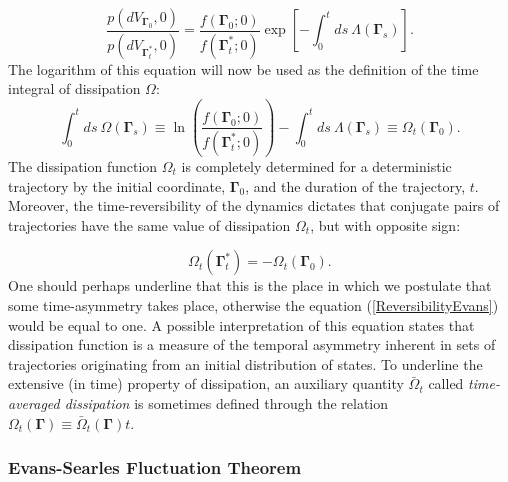 \documentclass[a4paper,12pt]{article}
\begin{document}
\begin{equation}
  \frac{p(d V_{\bm{\Gamma}_0}, 0)}{p(d V_{\bm{\Gamma}_t^*},0)}=
  \frac{f(\bm{\Gamma}_0;0)}{f(\bm{\Gamma}_t^*;0)} 
  \exp[-\int_0^t ds \ \Lambda(\bm{\Gamma}_s)].
\end{equation}
The logarithm of this equation will now be used as the definition of the time integral of dissipation $\Omega$:
\begin{equation}
  \label{Dissipation}
  \int_0^t ds\ \Omega(\bm{\Gamma}_s)\equiv \ln(\frac{f(\bm{\Gamma}_0;0)}{f(\bm{\Gamma}_t^*;0)}) -\int_0^t ds \ \Lambda(\bm{\Gamma}_s) \equiv \Omega_t(\bm{\Gamma}_0).
\end{equation}
The dissipation function $\Omega_t$ is completely determined for a deterministic trajectory by the initial coordinate, $\bm{\Gamma}_0$, and the duration of the trajectory, $t$. Moreover, the time-reversibility of the dynamics dictates that conjugate pairs of trajectories have the same value of dissipation $\Omega_t$, but with opposite sign:

\begin{equation}
  \Omega_t(\bm{\Gamma}_t^*)=-\Omega_t(\bm{\Gamma}_0).
\end{equation}
One should perhaps underline that this is the place in which we postulate that some time-asymmetry takes place, otherwise the equation (\ref{ReversibilityEvans}) would be equal to one.
A possible interpretation of this equation states that dissipation function is a measure of the temporal asymmetry inherent in sets of trajectories originating from an initial distribution of states.
To underline the extensive (in time) property of dissipation, an auxiliary quantity $\bar{\Omega}_t$ called \textit{time-averaged dissipation} is sometimes defined through the relation $\Omega_t(\bm{\Gamma}) \equiv \bar{\Omega}_t(\bm{\Gamma})t$.

\subsubsection{Evans-Searles Fluctuation Theorem}
\end{document}
